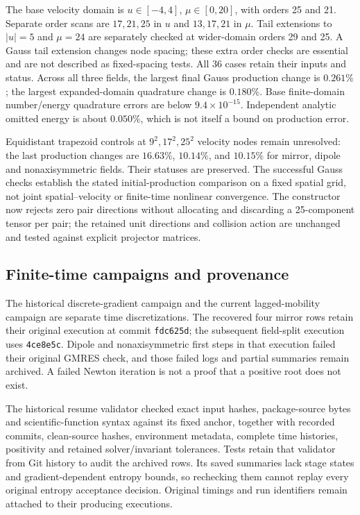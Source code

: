 \documentclass[11pt,letterpaper]{article}
\begin{document}
The base velocity domain is $u\in[-4,4]$, $\mu\in[0,20]$, with orders 25 and
21. Separate order scans are $17,21,25$ in $u$ and $13,17,21$ in $\mu$.
Tail extensions to $|u|=5$ and $\mu=24$ are separately checked at wider-domain
orders 29 and 25. A Gauss tail extension changes node spacing; these extra
order checks are essential and are not described as fixed-spacing tests.
All 36 cases retain their inputs and status. Across all three fields, the
largest final Gauss production change is $0.261\%$; the largest expanded-domain
quadrature change is $0.180\%$. Base finite-domain number/energy quadrature
errors are below $9.4\times10^{-15}$. Independent analytic omitted energy is
about $0.050\%$, which is not itself a bound on production error.

Equidistant trapezoid controls at $9^2,17^2,25^2$ velocity nodes remain
unresolved: the last production changes are $16.63\%$, $10.14\%$, and
$10.15\%$ for mirror, dipole and nonaxisymmetric fields. Their statuses are
preserved. The successful Gauss checks establish the stated initial-production
comparison on a fixed spatial grid, not joint spatial--velocity or finite-time
nonlinear convergence. The constructor now rejects zero pair directions
without allocating and discarding a 25-component tensor per pair; the
retained unit directions and collision action are unchanged and tested against
explicit projector matrices.

\subsection*{Finite-time campaigns and provenance}
The historical discrete-gradient campaign and the current lagged-mobility
campaign are separate time discretizations. The recovered four mirror rows
retain their original execution at commit \texttt{fdc625d}; the subsequent
field-split execution uses \texttt{4ce8e5c}. Dipole and nonaxisymmetric first
steps in that execution failed their original GMRES check, and those failed
logs and partial summaries remain archived. A failed Newton iteration is not
a proof that a positive root does not exist.

The historical resume validator checked exact input hashes, package-source
bytes and scientific-function syntax against its fixed anchor, together with
recorded commits, clean-source hashes, environment metadata, complete time
histories, positivity and retained solver/invariant tolerances. Tests retain
that validator from Git history to audit the archived rows. Its saved summaries
lack stage states and gradient-dependent entropy bounds, so rechecking them
cannot replay every original entropy acceptance decision. Original timings
and run identifiers remain attached to their producing executions.
\end{document}
